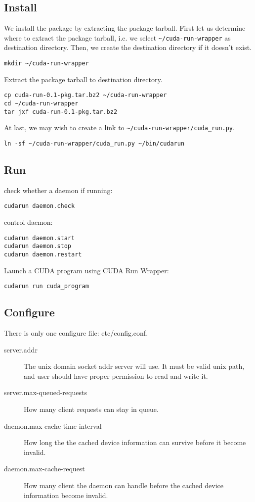 \documentclass[a4paper,11pt]{article}
\begin{document}
\subsection{Install}
We install the package by extracting the package tarball.
First let us determine where to extract the package tarball, i.e. we select \verb!~/cuda-run-wrapper! as destination directory.
Then, we create the destination directory if it doesn't exist.
\begin{Verbatim}[frame=single]
mkdir ~/cuda-run-wrapper
\end{Verbatim}
Extract the package tarball to destination directory.
\begin{Verbatim}[frame=single]
cp cuda-run-0.1-pkg.tar.bz2 ~/cuda-run-wrapper
cd ~/cuda-run-wrapper
tar jxf cuda-run-0.1-pkg.tar.bz2
\end{Verbatim}
At last, we may wish to create a link to \verb!~/cuda-run-wrapper/cuda_run.py!.
\begin{Verbatim}[frame=single]
ln -sf ~/cuda-run-wrapper/cuda_run.py ~/bin/cudarun 
\end{Verbatim}

\subsection{Run}
check whether a daemon if running:
\begin{Verbatim}[frame=single]
cudarun daemon.check
\end{Verbatim}

control daemon:
\begin{Verbatim}[frame=single]
cudarun daemon.start
cudarun daemon.stop
cudarun daemon.restart
\end{Verbatim}

Launch a CUDA program using CUDA Run Wrapper:
\begin{Verbatim}[frame=single]
cudarun run cuda_program
\end{Verbatim}

\subsection{Configure}
There is only one configure file: etc/config.conf.
\begin{description}
  \item[server.addr] The unix domain socket addr server will use. It must be valid unix path, and user should have proper permission to read and write it.
  \item[server.max-queued-requests] How many client requests can stay in queue.
  \item[daemon.max-cache-time-interval] How long the the cached device information can survive before it become invalid.
  \item[daemon.max-cache-request] How many client the daemon can handle before the cached device information become invalid.
\end{description}
\end{document}
